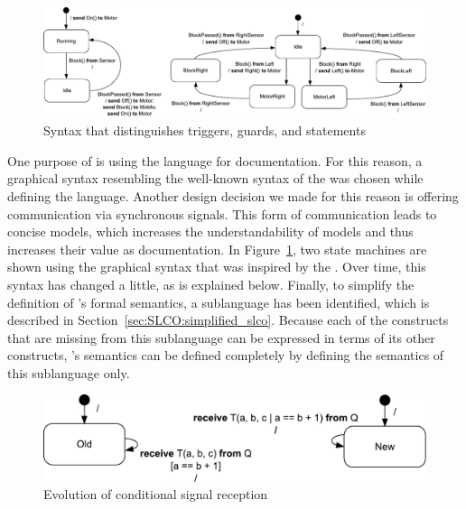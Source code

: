 \begin{figure}[hbt]
\centering
\includegraphics[scale=.49]{iterative-dsl-evolution/figs/middle_left_right}
\caption{Syntax that distinguishes triggers, guards, and statements}
\label{fig:iterative-dsl-evolution:old_syntax}
\end{figure}

One purpose of \SLCO is using the language for documentation.
For this reason, a graphical syntax resembling the well-known syntax of the \UML was chosen while defining the language.
Another design decision we made for this reason is offering communication via synchronous signals.
This form of communication leads to concise models, which increases the understandability of models and thus increases their value as documentation.
In Figure~\ref{fig:iterative-dsl-evolution:old_syntax}, two state machines are shown using the graphical syntax that was inspired by the \UML.
Over time, this syntax has changed a little, as is explained below.
Finally, to simplify the definition of \SLCO's formal semantics, a sublanguage has been identified, which is described in Section~\ref{sec:SLCO:simplified_slco}.
Because each of the constructs that are missing from this sublanguage can be expressed in terms of its other constructs, \SLCO's semantics can be defined completely by defining the semantics of this sublanguage only.






\begin{figure}[hbt]
  \centering
  \includegraphics[scale=.40]{iterative-dsl-evolution/figs/cond_before_after}
  \caption{Evolution of conditional signal reception}
  \label{fig:iterative-dsl-evolution:cond_before_after}
\end{figure}

